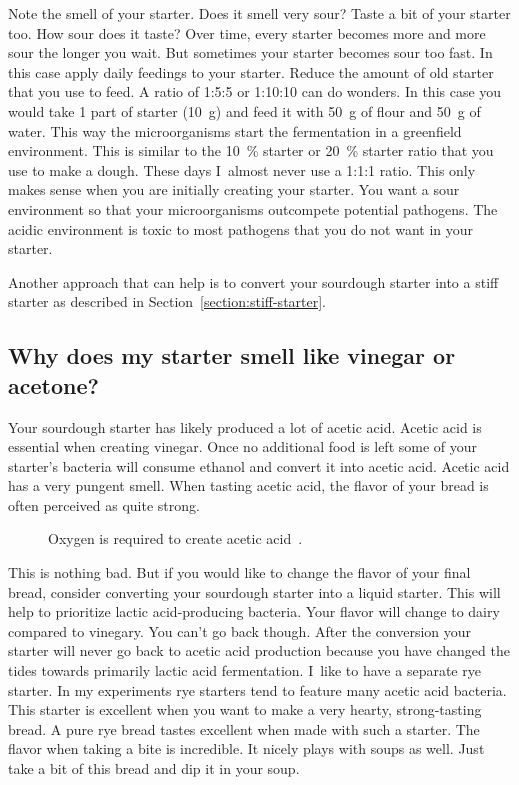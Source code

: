 Note the smell of your starter. Does it smell very sour?
Taste a bit of your starter too. How sour does it taste?
Over time, every starter becomes more and more sour the longer
you wait. But sometimes your starter becomes sour too fast.
In this case apply daily feedings to your starter. Reduce
the amount of old starter that you use to feed. A ratio
of 1:5:5 or 1:10:10 can do wonders. In this case you would
take 1 part of starter (\qty{10}{\gram}) and feed it with \qty{50}{\gram} of flour
and \qty{50}{\gram} of water. This way the microorganisms start
the fermentation in a greenfield environment. This is
similar to the \qty{10}{\percent} starter or  \qty{20}{\percent} starter
ratio that you use to make a dough. These days I~almost
never use a 1:1:1 ratio. This only makes sense when you
are initially creating your starter. You want a sour
environment so that your microorganisms outcompete
potential pathogens. The acidic environment is toxic
to most pathogens that you do not want in your starter.

Another approach that can help is to convert your
sourdough starter into a stiff starter as
described in Section~\ref{section:stiff-starter}.

\subsection{Why does my starter smell like vinegar or acetone?}

Your sourdough starter has likely produced a lot of acetic acid.
Acetic acid is essential when creating vinegar. Once no additional
food is left some of your starter's bacteria will consume ethanol
and convert it into acetic acid. Acetic acid has a very pungent smell.
When tasting acetic acid, the flavor of your bread is often perceived
as quite strong.

\begin{figure}[!htb]
\centering
  
  \caption[Acetic acid creation]{Oxygen is required to create acetic
      acid~\cite{acetic+acid+production}.}%
  \label{fig:ethanol-oxidation}
\end{figure}

This is nothing bad. But if you would like to change
the flavor of your final bread, consider converting
your sourdough starter into a liquid starter. This will
help to prioritize lactic acid-producing bacteria.
Your flavor will change to dairy compared to vinegary.
You can't go back though. After the conversion your starter
will never go back to acetic acid production because you have
changed the tides towards primarily lactic acid fermentation.
I~like to have a separate rye starter. In my experiments
rye starters tend to feature many acetic acid bacteria.
This starter is excellent when you want to make a very hearty,
strong-tasting bread. A pure rye bread tastes excellent when
made with such a starter. The flavor when taking a bite
is incredible. It nicely plays with soups as well. Just take
a bit of this bread and dip it in your soup.

